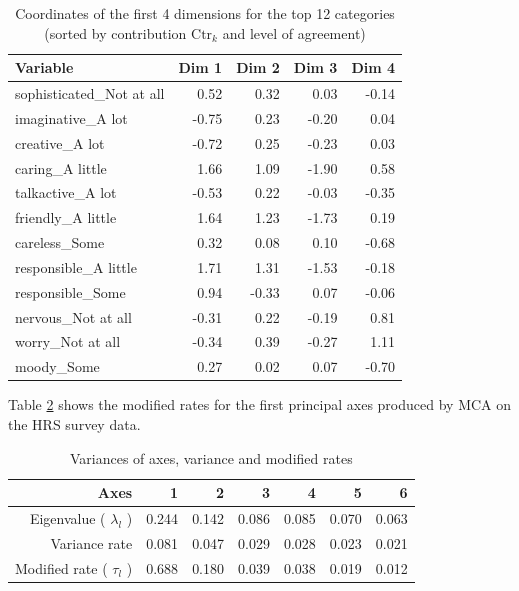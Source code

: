\documentclass[conference,final,]{IEEEtran}
\begin{document}
\begin{table}[H]
\centering
\begin{tabular}{lrrrr}
  \hline
  Variable & Dim 1 & Dim 2 & Dim 3 & Dim 4 \\ 
  \hline
  sophisticated\_Not at all & 0.52 & 0.32 & 0.03 & -0.14 \\ 
  imaginative\_A lot & -0.75 & 0.23 & -0.20 & 0.04 \\ 
  creative\_A lot & -0.72 & 0.25 & -0.23 & 0.03 \\ 
  caring\_A little & 1.66 & 1.09 & -1.90 & 0.58 \\ 
  talkactive\_A lot & -0.53 & 0.22 & -0.03 & -0.35 \\ 
  friendly\_A little & 1.64 & 1.23 & -1.73 & 0.19 \\ 
  careless\_Some & 0.32 & 0.08 & 0.10 & -0.68 \\ 
  responsible\_A little & 1.71 & 1.31 & -1.53 & -0.18 \\ 
  responsible\_Some & 0.94 & -0.33 & 0.07 & -0.06 \\ 
  nervous\_Not at all & -0.31 & 0.22 & -0.19 & 0.81 \\ 
  worry\_Not at all & -0.34 & 0.39 & -0.27 & 1.11 \\ 
  moody\_Some & 0.27 & 0.02 & 0.07 & -0.70 \\ 
   \hline
\end{tabular}
\caption{Coordinates of the first 4 dimensions for the top 12 categories (sorted by contribution $\text{Ctr}_k$ and level of agreement)} 
\label{tab:top12coord}
\end{table}

Table \ref{tab:modRate} shows the modified rates for the first principal
axes produced by MCA on the HRS survey data.

\begin{table}[!ht]
\centering
\begin{tabular}{rrrrrrr}
  \hline
 Axes & 1 & 2 & 3 & 4 & 5 & 6  \\ 
  \hline
 Eigenvalue ( $ \lambda_l $ ) & 0.244 & 0.142 & 0.086 & 0.085 & 0.070 & 0.063  \\  
 Variance rate                & 0.081 & 0.047 & 0.029 & 0.028 & 0.023 & 0.021  \\  
 Modified rate ( $ \tau_l $ ) & 0.688 & 0.180 & 0.039 & 0.038 & 0.019 & 0.012  \\ 
   \hline
\end{tabular}
\caption{Variances of axes, variance and modified rates} 
\label{tab:modRate}
\end{table}
\end{document}
